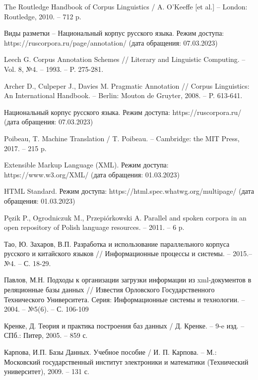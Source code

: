 \begin{thebibliography}{}
	The Routledge Handbook of Corpus Linguistics / A. O'Keeffe [et al.] -- London: Routledge, 2010. -- 712 p.
	
	Виды разметки -- Национальный корпус русского языка. Режим доступа: https://ruscorpora.ru/page/annotation/ (дата обращения: 07.03.2023)
	
	Leech G. Corpus Annotation Schemes // Literary and Linguistic Computing. -- Vol. 8, №4. -- 1993. -- P. 275-281.
	
	Archer D., Culpeper J., Davies M. Pragmatic Annotation // Corpus Linguistics: An International Handbook. -- Berlin: Mouton de Gruyter, 2008. -- P. 613-641. 
	
	Национальный корпус русского языка. Режим доступа: https://ruscorpora.ru/ (дата обращения: 07.03.2023)
	
	Poibeau, T. Machine Translation / T. Poibeau. -- Cambridge: the MIT Press, 2017. -- 215 p.
	
	Extensible Markup Language (XML). Режим доступа: https://www.w3.org/XML/ (дата обращения: 01.03.2023)
	
	HTML Standard. Режим доступа: https://html.spec.whatwg.org/multipage/ (дата обращения: 01.03.2023)
	
	Pęzik P., Ogrodniczuk M., Przepiórkowski A. Parallel and spoken corpora in an open repository of Polish language resources. -- 2011. -- 6 p.
	
	Тао, Ю. Захаров, В.П. Разработка и использование параллельного корпуса
	русского и китайского языков // Информационные процессы и системы. -- 2015.-- №4. -- С. 18-29.
	
	Павлов, М.Н. Подходы к организации загрузки информации из xml-документов в реляционные базы данных // Известия Орловского Государственного Технического Университета. Серия: Информационные системы и технологии. -- 2004. -- №5(6). -- С. 106-109
	
	Кренке, Д. Теория и практика построения баз данных / Д. Кренке. -- 9-e изд. -- СПб.: Питер, 2005. -- 859 с.
	
	Карпова, И.П. Базы Данных. Учебное пособие / И. П. Карпова. -- М.: Московский государственный институт электроники и математики (Технический университет), 2009. -- 131 с.
	

\end{thebibliography}
